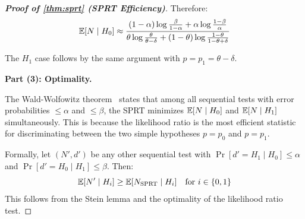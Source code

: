 \begin{proof}[\textbf{Proof of \cref{thm:sprt} (SPRT Efficiency)}]
Therefore:
\begin{equation}
  \mathbb{E}[N \mid H_0] \approx
    \frac{(1-\alpha)\log\frac{\beta}{1-\alpha} +
          \alpha\log\frac{1-\beta}{\alpha}}
         {\theta\log\frac{\theta}{\theta-\delta} +
          (1-\theta)\log\frac{1-\theta}{1-\theta+\delta}}
\end{equation}

The $H_1$ case follows by the same argument with $p = p_1 = \theta - \delta$.

\textbf{Part (3): Optimality.}

The Wald-Wolfowitz theorem~\citep{wald1947sequential} states that among
all sequential tests with error probabilities $\leq \alpha$ and
$\leq \beta$, the SPRT minimizes $\mathbb{E}[N \mid H_0]$ and $\mathbb{E}[N \mid H_1]$
simultaneously. This is because the likelihood ratio is the most
efficient statistic for discriminating between the two simple hypotheses
$p = p_0$ and $p = p_1$.

Formally, let $(N', d')$ be any other sequential test with
$\Pr[d' = H_1 \mid H_0] \leq \alpha$ and
$\Pr[d' = H_0 \mid H_1] \leq \beta$. Then:
\begin{equation}
  \mathbb{E}[N' \mid H_i] \geq \mathbb{E}[N_{\text{SPRT}} \mid H_i]
  \quad\text{for } i \in \{0, 1\}
\end{equation}
This follows from the Stein lemma and the optimality of the likelihood
ratio test. \qedhere
\end{proof}


